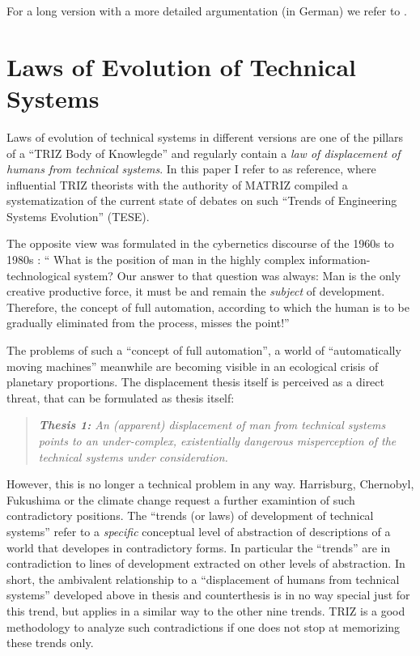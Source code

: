 \documentclass[11pt,a4paper]{article}
\begin{document}
For a long version with a more detailed argumentation (in German) we refer to
\cite{Graebe2020b}.

\section{Laws of Evolution of Technical Systems}

Laws of evolution of technical systems in different versions are one of the
pillars of a ``TRIZ Body of Knowlegde'' \cite{TBK-2007} and regularly contain
a \emph{law of displacement of humans from technical systems}.  In this paper
I refer to \cite{TESE2018} as reference, where influential TRIZ theorists with
the authority of MATRIZ compiled a systematization of the current state of
debates on such ``Trends of Engineering Systems Evolution'' (TESE).

The opposite view was formulated in the cybernetics discourse of the 1960s to
1980s \cite[p. 10]{KFK2000}: `` What is the position of man in the highly
complex information-techno\-logical system? Our answer to that question was
always: Man is the only creative productive force, it must be and remain the
\emph{subject} of development.  Therefore, the concept of full automation,
according to which the human is to be gradually eliminated from the process,
misses the point!''

The problems of such a ``concept of full automation'', a world of
``automatically moving machines'' meanwhile are becoming visible in an
ecological crisis of planetary proportions. The displacement thesis itself is
perceived as a direct threat, that can be formulated as thesis itself:
\begin{quote}\it
  \textbf{Thesis 1:} An (apparent) displacement of man from technical systems
  points to an under-complex, existentially dangerous misperception of the
  technical systems under consideration.
\end{quote}

However, this is no longer a technical problem in any way. Harrisburg,
Chernobyl, Fukushima or the climate change request a further examintion of
such contradictory positions.  The ``trends (or laws) of development of
technical systems'' refer to a \emph{specific} conceptual level of abstraction
of descriptions of a world that developes in contradictory forms.  In
particular the ``trends'' are in contradiction to lines of development
extracted on other levels of abstraction.  In short, the ambivalent
relationship to a ``displacement of humans from technical systems'' developed
above in thesis and counterthesis is in no way special just for this trend,
but applies in a similar way to the other nine trends.  TRIZ is a good
methodology to analyze such contradictions if one does not stop at memorizing
these trends only.
\end{document}
